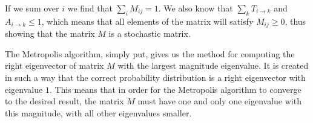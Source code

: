	If we sum over $i$ we find that $\sum_i M_{ij}=1$. We also know that $\sum_k T_{i\rightarrow k}$ and $A_{i\rightarrow k}\leq 1$, which means that all elements of the matrix will satisfy $M_{ij}\geq 0$, thus showing that the matrix $M$ is a stochastic matrix.
	
	The Metropolis algorithm, simply put, gives us the method for computing the right eigenvector of matrix $M$ with the largest magnitude eigenvalue. It is created in such a way that the correct probability distribution is a right eigenvector with eigenvalue $1$. This means that in order for the Metropolis algorithm to converge to the desired result, the matrix $M$ must have one and only one eigenvalue with this magnitude, with all other eigenvalues smaller.
